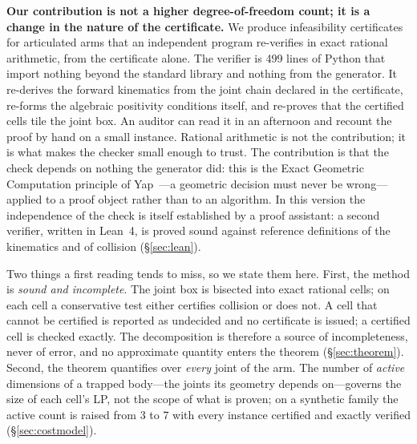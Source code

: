 \documentclass[10pt,twocolumn,letterpaper]{article}
\newif\ifhl \hlfalse  %
\newcommand{\new}[1]{\ifhl{\color{blue!65!black}#1}\else#1\fi}
\newcommand{\vone}[1]{#1}  %
\begin{document}
\textbf{Our contribution is not a higher degree-of-freedom count; it is a change in the nature of the certificate.} We produce infeasibility certificates for articulated arms that an independent program re-verifies in exact rational arithmetic, from the certificate alone. The verifier is 499 lines of Python that import nothing beyond the standard library and nothing from the generator. It re-derives the forward kinematics from the joint chain declared in the certificate, re-forms the algebraic positivity conditions itself, and re-proves that the certified cells tile the joint box. An auditor can read it in an afternoon and recount the proof by hand on a small instance. \vone{Rational arithmetic is not the contribution; it is what makes the checker small enough to trust. The contribution is that the check depends on nothing the generator did: this is the Exact Geometric Computation principle of Yap~\cite{yap1997}---a geometric decision must never be wrong---applied to a proof object rather than to an algorithm.} \new{In this version the independence of the check is itself established by a proof assistant: a second verifier, written in Lean~4, is proved sound against reference definitions of the kinematics and of collision (\S\ref{sec:lean}).}

\vone{Two things a first reading tends to miss, so we state them here. First, the method is \emph{sound and incomplete}. The joint box is bisected into exact rational cells; on each cell a conservative test either certifies collision or does not. A cell that cannot be certified is reported as undecided and no certificate is issued; a certified cell is checked exactly. The decomposition is therefore a source of incompleteness, never of error, and no approximate quantity enters the theorem (\S\ref{sec:theorem}). Second, the theorem quantifies over \emph{every} joint of the arm. The number of \emph{active} dimensions of a trapped body---the joints its geometry depends on---governs the size of each cell's LP, not the scope of what is proven; on a synthetic family the active count is raised from 3 to 7 with every instance certified and exactly verified (\S\ref{sec:costmodel}).}
\end{document}
